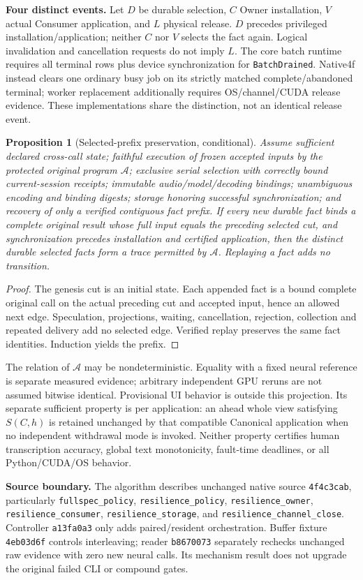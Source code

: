 \documentclass[10pt]{article}
\newtheorem{proposition}{Proposition}
\begin{document}
\textbf{Four distinct events.} Let $D$ be durable selection, $C$ Owner
installation, $V$ actual Consumer application, and $L$ physical release.
$D$ precedes privileged installation/application; neither $C$ nor $V$
selects the fact again. Logical invalidation and cancellation requests do
not imply $L$. The core batch runtime requires all terminal rows plus
device synchronization for \texttt{BatchDrained}. Native4f instead clears
one ordinary busy job on its strictly matched complete/abandoned terminal;
worker replacement additionally requires OS/channel/CUDA release evidence.
These implementations share the distinction, not an identical release event.

\begin{proposition}[Selected-prefix preservation, conditional]
Assume sufficient declared cross-call state; faithful execution of frozen
accepted inputs by the protected original program $\mathcal A$; exclusive
serial selection with correctly bound current-session receipts; immutable
audio/model/decoding bindings; unambiguous encoding and binding digests;
storage honoring successful synchronization; and recovery of only a
verified contiguous fact prefix. If every new durable fact binds a complete
original result whose full input equals the preceding selected cut,
and synchronization precedes installation and certified application,
then the distinct durable selected facts form a trace permitted by
$\mathcal A$. Replaying a fact adds no transition.
\end{proposition}
\begin{proof}
The genesis cut is an initial state. Each appended fact is a bound complete
original call on the actual preceding cut and accepted input, hence an
allowed next edge. Speculation, projections, waiting, cancellation,
rejection, collection and repeated delivery add no selected edge. Verified
replay preserves the same fact identities. Induction yields the prefix.
\end{proof}
The relation of $\mathcal A$ may be nondeterministic. Equality with a fixed
neural reference is separate measured evidence; arbitrary independent GPU
reruns are not assumed bitwise identical. Provisional UI behavior is outside
this projection. Its separate sufficient property is per application:
an ahead whole view satisfying $S(C,h)$ is retained unchanged by that
compatible Canonical application when no independent withdrawal mode is
invoked. Neither property certifies human transcription accuracy, global
text monotonicity, fault-time deadlines, or all Python/CUDA/OS behavior.

{\raggedright\textbf{Source boundary.} The algorithm describes unchanged native source
\texttt{4f4c3cab}, particularly \texttt{fullspec\_policy},
\texttt{resilience\_policy}, \texttt{resilience\_owner},
\texttt{resilience\_consumer}, \texttt{resilience\_storage}, and
\texttt{resilience\_channel\_close}. Controller \texttt{a13fa0a3} only adds
paired/resident orchestration. Buffer fixture \texttt{4eb03d6f} controls
interleaving; reader \texttt{b8670073} separately rechecks unchanged raw
evidence with zero new neural calls. Its mechanism result does not upgrade
the original failed CLI or compound gates.\par}
\end{document}

